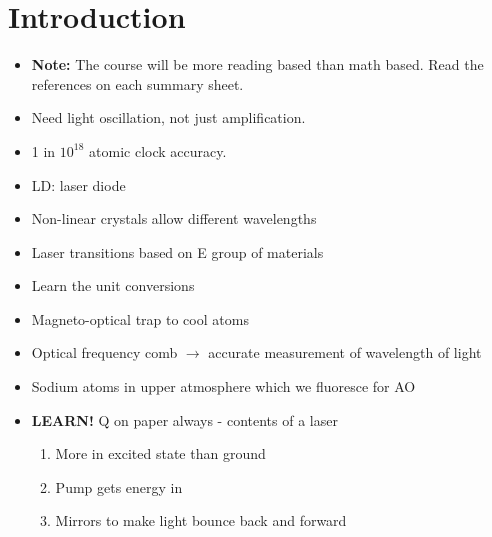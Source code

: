 \documentclass[a4paper, 11pt, normalem]{report}
\begin{document}
\chapter{Introduction}
\begin{itemize}
    \item \textbf{Note:} The course will be more reading based than math based.
Read the references on each summary sheet.
    \item Need light oscillation, not just amplification.
    \item 1 in $10^{18}$ atomic clock accuracy.
    \item LD: laser diode
    \item Non-linear crystals allow different wavelengths
    \item Laser transitions based on E group of materials
    \item Learn the unit conversions
    \item Magneto-optical trap to cool atoms
    \item Optical frequency comb $\to$ accurate measurement of wavelength of light
    \item Sodium atoms in upper atmosphere which we fluoresce for AO
    \item \textbf{LEARN!} Q on paper always - contents of a laser
        \begin{enumerate}
            \item More in excited state than ground
            \item Pump gets energy in
            \item Mirrors to make light bounce back and forward
        \end{enumerate}
\end{itemize}
\end{document}
